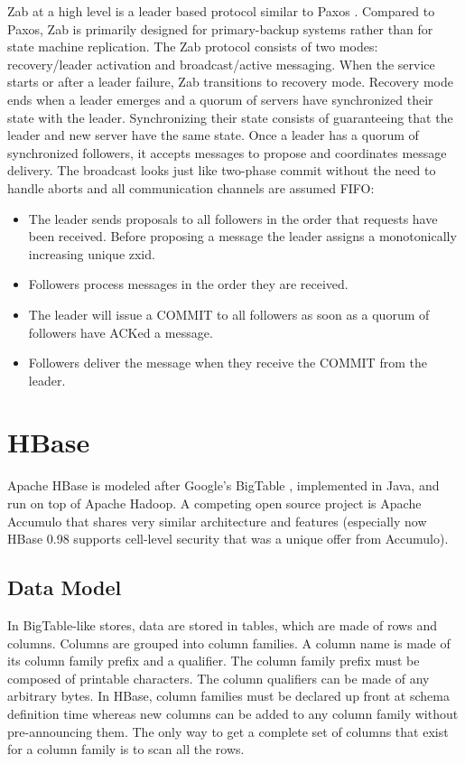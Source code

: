 \documentclass[11pt]{book}
\begin{document}
Zab at a high level is a leader based protocol similar to Paxos \cite{Lamport:1998:PP}. Compared to Paxos, Zab is primarily designed for primary-backup systems rather than for state machine replication.
The Zab protocol consists of two modes: recovery/leader activation and broadcast/active messaging. When the service starts or after a leader failure, Zab transitions to recovery mode. Recovery mode ends when a leader emerges and a quorum of servers have synchronized their state with the leader. Synchronizing their state consists of guaranteeing that the leader and new server have the same state.
Once a leader has a quorum of synchronized followers, it accepts messages to propose and coordinates message delivery. The broadcast looks just like two-phase commit \cite{opac:2009} without the need to handle aborts and all communication channels are assumed FIFO:
\begin{itemize}
\item The leader sends proposals to all followers in the order that requests have been received. Before proposing a message the leader assigns a monotonically increasing unique zxid.
\item Followers process messages in the order they are received.
\item The leader will issue a COMMIT to all followers as soon as a quorum of followers have ACKed a message.
\item Followers deliver the message when they receive the COMMIT from the leader.
\end{itemize}

\section[HBase]
{HBase}
Apache HBase \cite{HBase} is modeled after Google's BigTable \cite{Chang:2006:BDS}, implemented in Java, and run on top of Apache Hadoop. A competing open source project is Apache Accumulo \cite{Accumulo} that shares very similar architecture and features (especially now HBase 0.98 supports cell-level security that was a unique offer from Accumulo).

\subsection{Data Model}

In BigTable-like stores, data are stored in tables, which are made of rows and columns. Columns are grouped into column families. A column name is made of its column family prefix and a qualifier. The column family prefix must be composed of printable characters. The column qualifiers can be made of any arbitrary bytes. In HBase, column families must be declared up front at schema definition time whereas new columns can be added to any column family without pre-announcing them. The only way to get a complete set of columns that exist for a column family is to scan all the rows.
\end{document}
